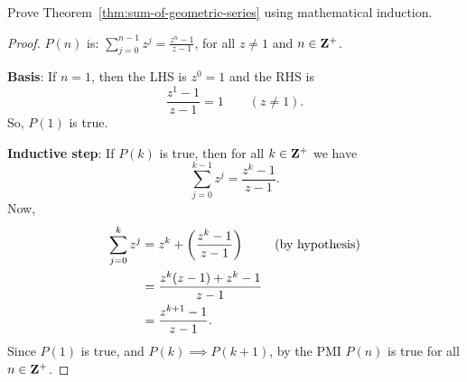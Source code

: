 \question[5] %
Prove Theorem~\ref{thm:sum-of-geometric-series} using mathematical induction.

\begin{EnvFullwidth}
\begin{solutionorgrid}[4.5in]
\begin{proof}
$P(n)$ is: $\displaystyle{\sum_{j = 0}^{n - 1} z^j = \frac{z^n - 1}{z - 1}}$, for all $z \neq 1$ and $n \in \mathbf{Z}^+$.

\textbf{Basis}: If $n = 1$, then the LHS is $z^0 = 1$ and the RHS is
\[
	\frac{z^1 - 1}{z - 1} = 1 \qquad (z \neq 1).
\]
So, $P(1)$ is true.

\textbf{Inductive step}: If $P(k)$ is true, then for all $k \in \mathbf{Z}^+$ we have
\[
	\sum_{j = 0}^{k - 1} z^j = \frac{z^k - 1}{z - 1}.
\]
Now,
\begin{align*}
	\sum_{j = 0}^k z^j &= z^k + \left(\frac{z^k - 1}{z - 1}\right) && (\textrm{by hypothesis}) \\
	&= \frac{z^k(z - 1) + z^k - 1}{z - 1} \\
	&= \frac{z^{k + 1} - 1}{z - 1}.
\end{align*}
Since $P(1)$ is true, and $P(k) \implies P(k + 1)$, by the PMI $P(n)$ is true for all $n \in \mathbf{Z}^+$.
\end{proof}
\end{solutionorgrid}
\end{EnvFullwidth}
